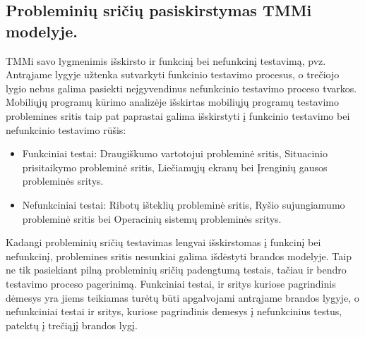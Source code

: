 \documentclass{VUMIFPSkursinis}
\begin{document}
\subsection{Probleminių sričių pasiskirstymas TMMi modelyje.}
TMMi savo lygmenimis išskirsto ir funkcinį bei nefunkcinį testavimą, pvz. Antrąjame lygyje užtenka sutvarkyti funkcinio testavimo procesus, o trečiojo lygio nebus galima pasiekti neįgyvendinus nefunkcinio testavimo proceso tvarkos. Mobiliųjų programų kūrimo analizėje išskirtas mobiliųjų programų testavimo problemines sritis taip pat paprastai galima išskirstyti į funkcinio testavimo bei nefunkcinio testavimo rūšis:
\begin{itemize}
   \item Funkciniai testai: Draugiškumo vartotojui probleminė sritis, Situacinio prisitaikymo probleminė sritis, Liečiamųjų ekranų bei Įrenginių gausos probleminės sritys.
   \item Nefunkciniai testai: Ribotų išteklių probleminė sritis, Ryšio sujungiamumo probleminė sritis bei Operacinių sistemų probleminės sritys.
\end{itemize}
\bigskip
Kadangi probleminių sričių testavimas lengvai išskirstomas į funkcinį bei nefunkcinį, problemines sritis nesunkiai galima išdėstyti brandos modelyje. Taip ne tik pasiekiant pilną probleminių sričių padengtumą testais, tačiau ir bendro testavimo proceso pagerinimą. Funkciniai testai, ir sritys kuriose pagrindinis dėmesys yra jiems teikiamas turėtų būti apgalvojami antrąjame brandos lygyje, o nefunkciniai testai ir sritys, kuriose pagrindinis demesys į nefunkcinius testus, patektų į trečiąjį brandos lygį.
\end{document}

